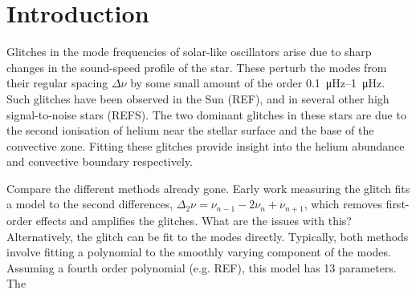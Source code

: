 \documentclass[linenumbers,modern]{aastex631dm}
\begin{document}

\section{Introduction}\label{sec:intro}

Glitches in the mode frequencies of solar-like oscillators arise due to sharp
changes in the sound-speed profile of the star. These perturb the modes from
their regular spacing \(\Delta\nu\) by some small amount of the order
\SIrange{0.1}{1}{\micro\Hz}. Such glitches have been observed in the Sun (REF),
and in several other high signal-to-noise stars (REFS). The two dominant
glitches in these stars are due to the second ionisation of helium near the
stellar surface and the base of the convective zone. Fitting these
glitches provide insight into the helium abundance and convective boundary
respectively.

Compare the different methods already gone. Early work measuring the glitch
fits a model to the second differences,
\(\Delta_2\nu = \nu_{n-1} - 2\nu_n + \nu_{n+1}\),
which removes first-order effects and amplifies the glitches. What are the
issues with this? Alternatively,
the glitch can be fit to the modes directly. Typically, both methods involve
fitting a polynomial to the smoothly varying component of the modes. Assuming
a fourth order polynomial (e.g. REF), this model has 13 parameters. The
\end{document}

